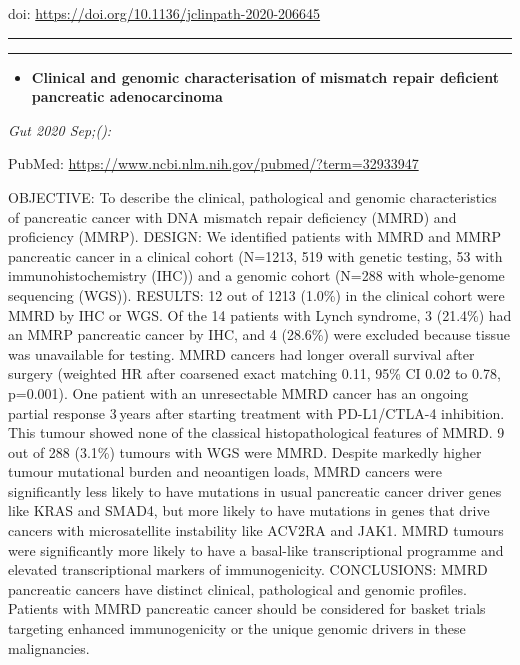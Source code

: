 \documentclass[
]{article}
\providecommand{\tightlist}{%
  \setlength{\itemsep}{0pt}\setlength{\parskip}{0pt}}
\begin{document}
doi: \url{https://doi.org/10.1136/jclinpath-2020-206645}

\begin{center}\rule{0.5\linewidth}{0.5pt}\end{center}

\begin{center}\rule{0.5\linewidth}{0.5pt}\end{center}

\begin{itemize}
\tightlist
\item
  \textbf{Clinical and genomic characterisation of mismatch repair
  deficient pancreatic adenocarcinoma}
\end{itemize}

\emph{Gut 2020 Sep;():}

PubMed: \url{https://www.ncbi.nlm.nih.gov/pubmed/?term=32933947}

OBJECTIVE: To describe the clinical, pathological and genomic
characteristics of pancreatic cancer with DNA mismatch repair deficiency
(MMRD) and proficiency (MMRP). DESIGN: We identified patients with MMRD
and MMRP pancreatic cancer in a clinical cohort (N=1213, 519 with
genetic testing, 53 with immunohistochemistry (IHC)) and a genomic
cohort (N=288 with whole-genome sequencing (WGS)). RESULTS: 12 out of
1213 (1.0\%) in the clinical cohort were MMRD by IHC or WGS. Of the 14
patients with Lynch syndrome, 3 (21.4\%) had an MMRP pancreatic cancer
by IHC, and 4 (28.6\%) were excluded because tissue was unavailable for
testing. MMRD cancers had longer overall survival after surgery
(weighted HR after coarsened exact matching 0.11, 95\% CI 0.02 to 0.78,
p=0.001). One patient with an unresectable MMRD cancer has an ongoing
partial response 3 years after starting treatment with PD-L1/CTLA-4
inhibition. This tumour showed none of the classical histopathological
features of MMRD. 9 out of 288 (3.1\%) tumours with WGS were MMRD.
Despite markedly higher tumour mutational burden and neoantigen loads,
MMRD cancers were significantly less likely to have mutations in usual
pancreatic cancer driver genes like KRAS and SMAD4, but more likely to
have mutations in genes that drive cancers with microsatellite
instability like ACV2RA and JAK1. MMRD tumours were significantly more
likely to have a basal-like transcriptional programme and elevated
transcriptional markers of immunogenicity. CONCLUSIONS: MMRD pancreatic
cancers have distinct clinical, pathological and genomic profiles.
Patients with MMRD pancreatic cancer should be considered for basket
trials targeting enhanced immunogenicity or the unique genomic drivers
in these malignancies.
\end{document}
